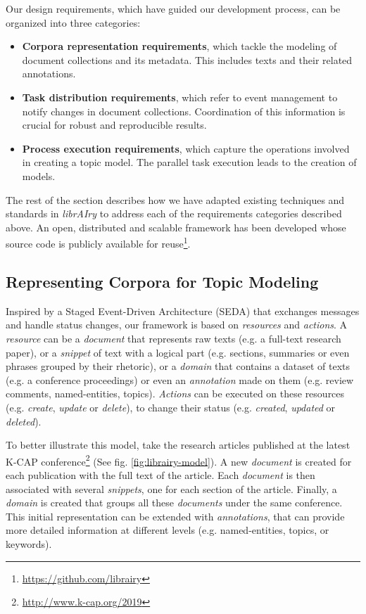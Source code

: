 Our design requirements, which have guided our development process, can be organized into three categories:
\begin{itemize}
\item \textbf{Corpora representation requirements}, which tackle the modeling of document collections and its metadata. This includes texts and their related annotations.
\item \textbf{Task distribution requirements}, which refer to event management to notify changes in document collections. Coordination of this information is crucial for robust and reproducible results.  
\item \textbf{Process execution requirements}, which capture the operations involved in creating a topic model. The parallel task execution leads to the creation of models.
\end{itemize}

The rest of the section describes how we have adapted existing techniques and standards in \textit{librAIry} to address each of the requirements categories described above. An open, distributed and scalable framework has been developed whose source code is publicly available for reuse\footnote{\url{https://github.com/librairy}}.

\subsection{Representing Corpora for Topic Modeling}
\label{sec:representing-corpora}

Inspired by a Staged Event-Driven Architecture (SEDA) that exchanges messages and handle status changes, our framework is based on \textit{resources} and \textit{actions}. A \textit{resource} can be a \textit{document} that represents raw texts (e.g. a full-text research paper), or a \textit{snippet} of text with a logical part  (e.g. sections, summaries or even phrases grouped by their rhetoric), or a \textit{domain} that contains a dataset of texts (e.g. a conference proceedings) or even an \textit{annotation} made on them (e.g. review comments, named-entities, topics). \textit{Actions} can be executed on these resources (e.g. \textit{create}, \textit{update} or \textit{delete}), to change their status (e.g. \textit{created}, \textit{updated} or \textit{deleted}).

To better illustrate this model, take the research articles published at the latest K-CAP conference\footnote{\url{http://www.k-cap.org/2019}} (See fig. \ref{fig:librairy-model}). A new \textit{document} is created for each publication with the full text of the article. Each \textit{document} is then associated with several \textit{snippets}, one for each section of the article. Finally, a \textit{domain} is created that groups all these \textit{documents} under the same conference. This initial representation can be extended with \textit{annotations}, that can provide more detailed information at different levels (e.g. named-entities, topics, or keywords).

